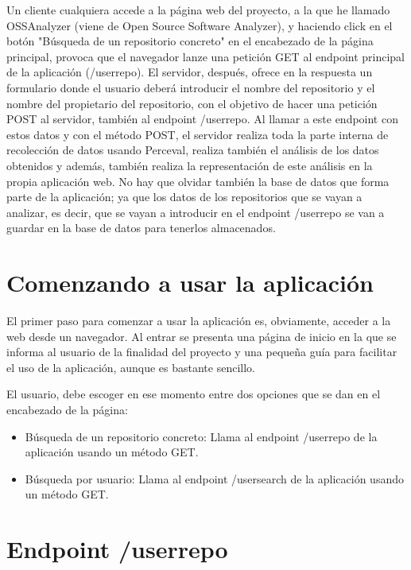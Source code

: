 \documentclass[a4paper, 12pt]{book}
\begin{document}
Un cliente cualquiera accede a la página web del proyecto, a la que he llamado OSSAnalyzer (viene de Open Source Software Analyzer), y haciendo click en el botón "Búsqueda de un repositorio concreto" en el encabezado de la página principal, provoca que el navegador lanze una petición GET al endpoint principal de la aplicación (/userrepo). El servidor, después, ofrece en la respuesta un formulario donde el usuario deberá introducir el nombre del repositorio y el nombre del propietario del repositorio, con el objetivo de hacer una petición POST al servidor, también al endpoint /userrepo. Al llamar a este endpoint con estos datos y con el método POST, el servidor realiza toda la parte interna de recolección de datos usando Perceval, realiza también el análisis de los datos obtenidos y además, también realiza la representación de este análisis en la propia aplicación web. No hay que olvidar también la base de datos que forma parte de la aplicación; ya que los datos de los repositorios que se vayan a analizar, es decir, que se vayan a introducir en el endpoint /userrepo se van a guardar en la base de datos para tenerlos almacenados.

\section{Comenzando a usar la aplicación} 
\label{sec:Empezando a usar la aplicación}

El primer paso para comenzar a usar la aplicación es, obviamente, acceder a la web desde un navegador. Al entrar se presenta una página de inicio en la que se informa al usuario de la finalidad del proyecto y una pequeña guía para facilitar el uso de la aplicación, aunque es bastante sencillo.

El usuario, debe escoger en ese momento entre dos opciones que se dan en el encabezado de la página:

\begin{itemize}
  \item Búsqueda de un repositorio concreto: Llama al endpoint /userrepo de la aplicación usando un método GET.
  \item Búsqueda por usuario: Llama al endpoint /usersearch de la aplicación usando un método GET.
\end{itemize}
 
\section{Endpoint /userrepo} 
\label{sec:/userrepo}
\end{document}
